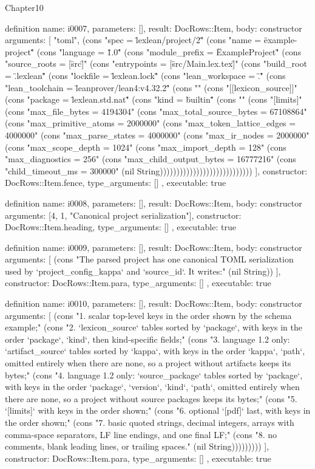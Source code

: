 \begin{lexlean}{Chapter10}
\begin{semanticmodule}
definition{
  name: i0007,
  parameters: [],
  result: DocRows::Item,
  body: constructor{
    arguments: [
      "toml",
      (cons "spec = \"lexlean/project/2\"" (cons "name = \"example-project\"" (cons "language = \"1.0\"" (cons "module_prefix = \"ExampleProject\"" (cons "source_roots = [\"src\"]" (cons "entrypoints = [\"src/Main.lex.tex\"]" (cons "build_root = \".lexlean\"" (cons "lockfile = \"lexlean.lock\"" (cons "lean_workspace = \".\"" (cons "lean_toolchain = \"leanprover/lean4:v4.32.2\"" (cons "" (cons "[[lexicon_source]]" (cons "package = \"lexlean.std.nat\"" (cons "kind = \"builtin\"" (cons "" (cons "[limits]" (cons "max_file_bytes = 4194304" (cons "max_total_source_bytes = 67108864" (cons "max_primitive_atoms = 2000000" (cons "max_token_lattice_edges = 4000000" (cons "max_parse_states = 4000000" (cons "max_ir_nodes = 2000000" (cons "max_scope_depth = 1024" (cons "max_import_depth = 128" (cons "max_diagnostics = 256" (cons "max_child_output_bytes = 16777216" (cons "child_timeout_ms = 300000" (nil String))))))))))))))))))))))))))))
    ],
    constructor: DocRows::Item.fence,
    type_arguments: []
  },
  executable: true
}

definition{
  name: i0008,
  parameters: [],
  result: DocRows::Item,
  body: constructor{
    arguments: [4, 1, "Canonical project serialization"],
    constructor: DocRows::Item.heading,
    type_arguments: []
  },
  executable: true
}

definition{
  name: i0009,
  parameters: [],
  result: DocRows::Item,
  body: constructor{
    arguments: [
      (cons "The parsed project has one canonical TOML serialization used by `project_config_kappa` and `source_id`. It writes:" (nil String))
    ],
    constructor: DocRows::Item.para,
    type_arguments: []
  },
  executable: true
}

definition{
  name: i0010,
  parameters: [],
  result: DocRows::Item,
  body: constructor{
    arguments: [
      (cons "1. scalar top-level keys in the order shown by the schema example;" (cons "2. `lexicon_source` tables sorted by `package`, with keys in the order `package`, `kind`, then kind-specific fields;" (cons "3. language 1.2 only: `artifact_source` tables sorted by `kappa`, with keys in the order `kappa`, `path`, omitted entirely when there are none, so a project without artifacts keeps its bytes;" (cons "4. language 1.2 only: `source_package` tables sorted by `package`, with keys in the order `package`, `version`, `kind`, `path`, omitted entirely when there are none, so a project without source packages keeps its bytes;" (cons "5. `[limits]` with keys in the order shown;" (cons "6. optional `[pdf]` last, with keys in the order shown;" (cons "7. basic quoted strings, decimal integers, arrays with comma-space separators, LF line endings, and one final LF;" (cons "8. no comments, blank leading lines, or trailing spaces." (nil String)))))))))
    ],
    constructor: DocRows::Item.para,
    type_arguments: []
  },
  executable: true
}


\end{semanticmodule}
\end{lexlean}
